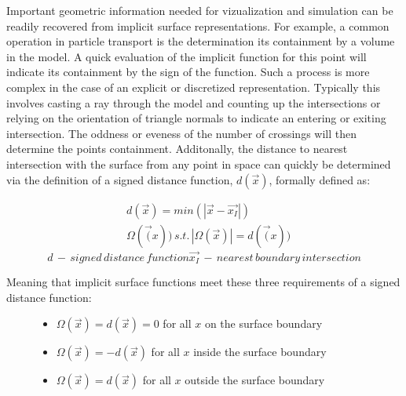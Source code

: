 \documentclass[12pt, a4paper]{article}
\begin{document}
Important geometric information needed for vizualization and simulation can be readily recovered from implicit surface representations. For example, a common operation in particle transport is the determination its containment by a volume in the model. A quick evaluation of the implicit function for this point will indicate its containment by the sign of the function. Such a process is more complex in the case of an explicit or discretized representation. Typically this involves casting a ray through the model and counting up the intersections or relying on the orientation of triangle normals to indicate an entering or exiting intersection. The oddness or eveness of the number of crossings will then determine the points containment. Additonally, the distance to nearest intersection with the surface from any point in space can quickly be determined via the definition of a signed distance function, $d(\vec{x})$, formally defined as:

\begin{align}
  & d(\vec{x}) = min(|\vec{x} - \vec{x_{I}}|) \\
  & \Omega(\vec(x))  \,s.t.  \,|\Omega(\vec{x})| = d(\vec(x)) 
\end{align}
\begin{equation*}
  d \, - \, signed \, distance \, function
  \vec{x_{I}} \,- \,nearest \, boundary \,intersection
\end{equation*}

Meaning that implicit surface functions meet these three requirements of a signed distance function:

\begin{figure}[H]
  \begin{itemize}
  \item $ \Omega(\vec{x}) = d(\vec{x}) = 0 $ for all $x$ on the surface boundary
  \item $ \Omega(\vec{x}) = -d(\vec{x}) $ for all $x$ inside the surface boundary
  \item $ \Omega(\vec{x}) = d(\vec{x}) $ for all $x$ outside the surface boundary
  \end{itemize}
\end{figure}
\end{document}
